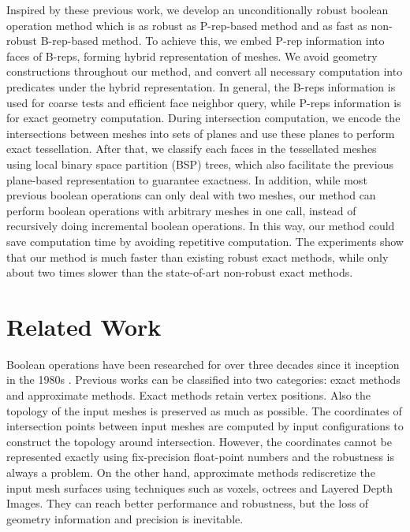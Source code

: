 \documentclass[10pt,journal,compsoc]{IEEEtran}
\begin{document}
Inspired by these previous work, we develop an unconditionally robust boolean operation method which is as robust as P-rep-based method and as fast as non-robust B-rep-based method. To achieve this, we embed P-rep information into faces of B-reps, forming hybrid representation of meshes. We avoid geometry constructions throughout our method, and convert all necessary computation into predicates under the hybrid representation. In general, the B-reps information is used for coarse tests and efficient face neighbor query, while P-reps information is for exact geometry computation. During intersection computation, we encode the intersections between meshes into sets of planes and use these planes to perform exact tessellation. After that, we classify each faces in the tessellated meshes using local binary space partition (BSP) trees, which also facilitate the previous plane-based representation to guarantee exactness.  In addition, while most previous boolean operations can only deal with two meshes, our method can perform boolean operations with arbitrary meshes in one call, instead of recursively doing incremental boolean operations. In this way, our method could save computation time by avoiding repetitive computation. The experiments show that our method is much faster than existing robust exact methods, while only about two times slower than the state-of-art non-robust exact methods.



\section{Related Work}

Boolean operations have been researched for over three decades since it inception in the 1980s \cite{requicha1985boolean, laidlaw1986constructive}. Previous works can be classified into two categories: exact methods and approximate methods. Exact methods retain vertex positions. Also the topology of the input meshes is preserved as much as possible. The coordinates of intersection points between input meshes are computed by input configurations to construct the topology around intersection. However, the coordinates cannot be represented exactly using fix-precision float-point numbers and the robustness is always a problem. On the other hand, approximate methods rediscretize the input mesh surfaces using techniques such as voxels, octrees and Layered Depth Images. They can reach better performance and robustness, but the loss of geometry information and precision is inevitable.
\end{document}
